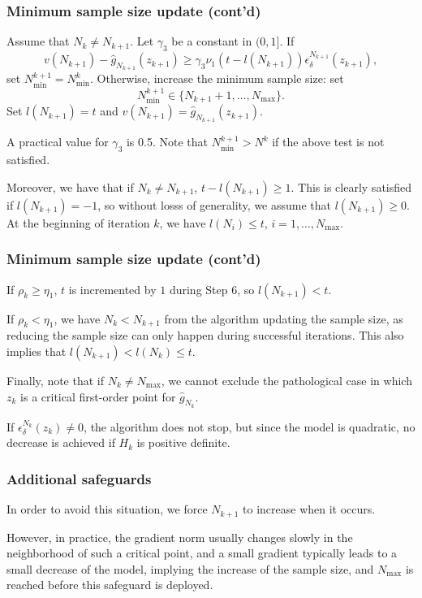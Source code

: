 \documentclass{beamer}
\begin{document}
\begin{frame}
\frametitle{Minimum sample size update (cont'd)}

Assume that $N_k \ne N_{k+1}$.
Let $\gamma_3$ be a constant in $(0,1]$. If
\[
v(N_{k+1}) - \hat{g}_{N_{k+1}}(z_{k+1}) \geq
\gamma_3\nu_1(t-l(N_{k+1}))\epsilon_{\delta}^{N_{k+1}}(z_{k+1}),
\]
set $N_{\min}^{k+1} = N_{\min}^k$.
Otherwise, increase the minimum sample size: set
\[
N^{k+1}_{\min} \in \lbrace N_{k+1}+1,\ldots,N_{\max} \rbrace .
\]
Set $l(N_{k+1}) = t$ and $v(N_{k+1}) = \hat{g}_{N_{k+1}}(z_{k+1})$.

\mbox{}

A practical value for $\gamma_3$ is 0.5.
Note that $N^{k+1}_{\min} > N^k$ if the above test is not satisfied.

Moreover, we have that if $N_k \ne N_{k+1}$, $t-l(N_{k+1}) \geq 1$.
This is clearly satisfied if $l(N_{k+1}) = -1$, so without losss of generality, we assume that $l(N_{k+1}) \geq 0$.
At the beginning of iteration $k$, we have $l(N_i) \leq t$, $i = 1,\ldots,N_{\max}$.

\end{frame}

\begin{frame}
\frametitle{Minimum sample size update (cont'd)}

If $\rho_k \geq \eta_1$, $t$ is incremented by $1$ during Step 6, so $l(N_{k+1}) <
t$.

\mbox{}

If $\rho_k < \eta_1$, we have $N_k < N_{k+1}$ from the algorithm updating the sample size, as reducing the sample size can only happen during successful iterations.
This also implies that $l(N_{k+1}) < l(N_k) \leq t$.

\mbox{}

Finally, note that if $N_k \ne N_{\max}$, we cannot exclude the pathological case in which $z_k$ is a critical first-order point for $\hat{g}_{N_k}$.

If $\epsilon_{\delta}^{N_k}(z_k) \ne 0$, the algorithm does not stop, but since the model is quadratic, no decrease is achieved if $H_k$ is positive definite.

\end{frame}

\begin{frame}
\frametitle{Additional safeguards}

In order to avoid this situation, we force  $N_{k+1}$ to increase when it occurs.

\mbox{}

However, in practice, the gradient norm usually changes slowly in the neighborhood of such a critical point, and a small gradient typically leads to a small decrease of the model, implying the increase of the sample size, and $N_{\max}$ is reached before this safeguard is deployed.

\end{frame}
\end{document}
